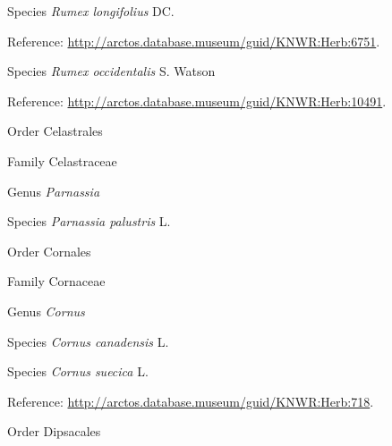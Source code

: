 \documentclass[9pt, article]{memoir}
\begin{document}
\begin{multicols}{2}
\vspace{6pt}\noindent\hspace{36pt}Species \textit{Rumex longifolius} DC.


\vspace{6pt}Reference: 
\url{http://arctos.database.museum/guid/KNWR:Herb:6751}.

\vspace{6pt}\noindent\hspace{36pt}Species \textit{Rumex occidentalis} S. Watson


\vspace{6pt}Reference: 
\url{http://arctos.database.museum/guid/KNWR:Herb:10491}.

\vspace{6pt}\noindent\hspace{18pt}Order Celastrales


\vspace{6pt}\noindent\hspace{24pt}Family Celastraceae


\vspace{6pt}\noindent\hspace{30pt}Genus \textit{Parnassia}


\vspace{6pt}\noindent\hspace{36pt}Species \textit{Parnassia palustris} L.


\vspace{6pt}\noindent\hspace{18pt}Order Cornales


\vspace{6pt}\noindent\hspace{24pt}Family Cornaceae


\vspace{6pt}\noindent\hspace{30pt}Genus \textit{Cornus}


\vspace{6pt}\noindent\hspace{36pt}Species \textit{Cornus canadensis} L.


\vspace{6pt}\noindent\hspace{36pt}Species \textit{Cornus suecica} L.


\vspace{6pt}Reference: 
\url{http://arctos.database.museum/guid/KNWR:Herb:718}.

\vspace{6pt}\noindent\hspace{18pt}Order Dipsacales



\end{multicols}
\end{document}
